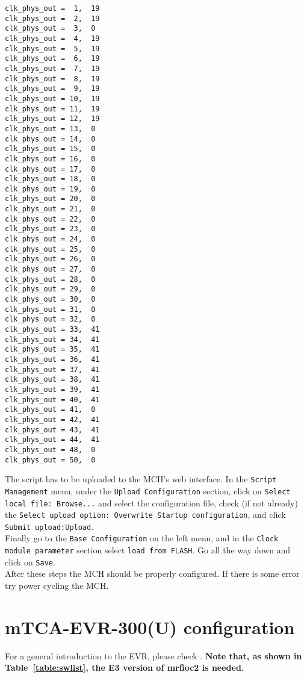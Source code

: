 \documentclass[11pt
  , a4paper
  , article
  , oneside
  , showtrims
]{memoir}
\begin{document}
\begin{lstlisting}[style=termstyle]
clk_phys_out =  1,  19
clk_phys_out =  2,  19
clk_phys_out =  3,  0
clk_phys_out =  4,  19
clk_phys_out =  5,  19
clk_phys_out =  6,  19
clk_phys_out =  7,  19
clk_phys_out =  8,  19
clk_phys_out =  9,  19
clk_phys_out = 10,  19
clk_phys_out = 11,  19
clk_phys_out = 12,  19
clk_phys_out = 13,  0
clk_phys_out = 14,  0
clk_phys_out = 15,  0
clk_phys_out = 16,  0
clk_phys_out = 17,  0
clk_phys_out = 18,  0
clk_phys_out = 19,  0
clk_phys_out = 20,  0
clk_phys_out = 21,  0
clk_phys_out = 22,  0
clk_phys_out = 23,  0
clk_phys_out = 24,  0
clk_phys_out = 25,  0
clk_phys_out = 26,  0
clk_phys_out = 27,  0
clk_phys_out = 28,  0
clk_phys_out = 29,  0
clk_phys_out = 30,  0
clk_phys_out = 31,  0
clk_phys_out = 32,  0
clk_phys_out = 33,  41
clk_phys_out = 34,  41
clk_phys_out = 35,  41
clk_phys_out = 36,  41
clk_phys_out = 37,  41
clk_phys_out = 38,  41
clk_phys_out = 39,  41
clk_phys_out = 40,  41
clk_phys_out = 41,  0
clk_phys_out = 42,  41
clk_phys_out = 43,  41
clk_phys_out = 44,  41
clk_phys_out = 48,  0
clk_phys_out = 50,  0

\end{lstlisting}

The script has to be uploaded to the MCH's web interface. In the \texttt{Script Management} menu, under the \texttt{Upload Configuration} section, click on \texttt{Select local file: Browse...} and select the configuration file, check (if not already) the \texttt{Select upload option: Overwrite Startup configuration}, and click \texttt{Submit upload:Upload}.\\

Finally go to the \texttt{Base Configuration} on the left menu, and in the \texttt{Clock module parameter} section select \texttt{load from FLASH}. Go all the way down and click on \texttt{Save}.\\

After these steps the MCH should be properly configured. If there is some error try power cycling the MCH.\\


\section{mTCA-EVR-300(U) configuration}\label{sec:evrconf}
For a general introduction to the EVR, please check \citep{EVRMANUAL}. \textbf{Note that, as shown in Table~\ref{table:swlist}, the E3 version of mrfioc2 is needed.}\\
\end{document}
